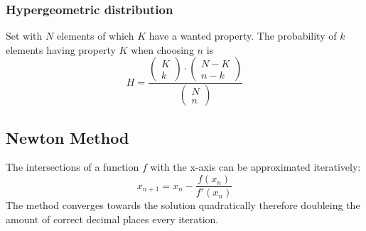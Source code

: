 \subsubsection{Hypergeometric distribution}
Set with $N$ elements of which $K$ have a wanted property. The
probability of $k$ elements having property $K$ when choosing $n$ is
\[
H = \frac{
	\left(\begin{array}{c}K\\k\end{array}\right)
	\cdot 
	\left(\begin{array}{c}N-K\\n-k\end{array}\right)
}
{
	\left(\begin{array}{c}N\\n\end{array}\right)
}
\]
\subsection{Newton Method}
The intersections of a function $f$ with the x-axis can be
approximated iteratively:
\[
x_{n + 1} = x_n - \frac{f(x_n)}{f'(x_n)} 
\]
The method converges towards the solution quadratically therefore
doubleing the amount of correct decimal places every iteration.


